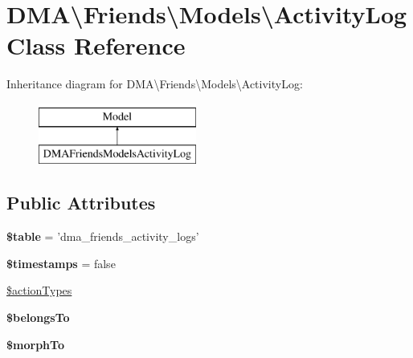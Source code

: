 \hypertarget{classDMA_1_1Friends_1_1Models_1_1ActivityLog}{\section{D\-M\-A\textbackslash{}Friends\textbackslash{}Models\textbackslash{}Activity\-Log Class Reference}
\label{classDMA_1_1Friends_1_1Models_1_1ActivityLog}
}
Inheritance diagram for D\-M\-A\textbackslash{}Friends\textbackslash{}Models\textbackslash{}Activity\-Log\-:\begin{figure}[H]
\begin{center}
\leavevmode
\includegraphics[height=2.000000cm]{d8/ddf/classDMA_1_1Friends_1_1Models_1_1ActivityLog}
\end{center}
\end{figure}
\subsection*{Public Attributes}
\begin{DoxyCompactItemize}
\item 
\hypertarget{classDMA_1_1Friends_1_1Models_1_1ActivityLog_a231d21bb93f9c0079c3f5cf51369d0c1}{{\bfseries \$table} = 'dma\-\_\-friends\-\_\-activity\-\_\-logs'}\label{classDMA_1_1Friends_1_1Models_1_1ActivityLog_a231d21bb93f9c0079c3f5cf51369d0c1}

\item 
\hypertarget{classDMA_1_1Friends_1_1Models_1_1ActivityLog_a11055e835c6bf48f58e019267dd469a2}{{\bfseries \$timestamps} = false}\label{classDMA_1_1Friends_1_1Models_1_1ActivityLog_a11055e835c6bf48f58e019267dd469a2}

\item 
\hyperlink{classDMA_1_1Friends_1_1Models_1_1ActivityLog_aa60b5fe0e1e7c254827bfa35c69aef9d}{\$action\-Types}
\item 
{\bfseries \$belongs\-To}
\item 
{\bfseries \$morph\-To}
\end{DoxyCompactItemize}
